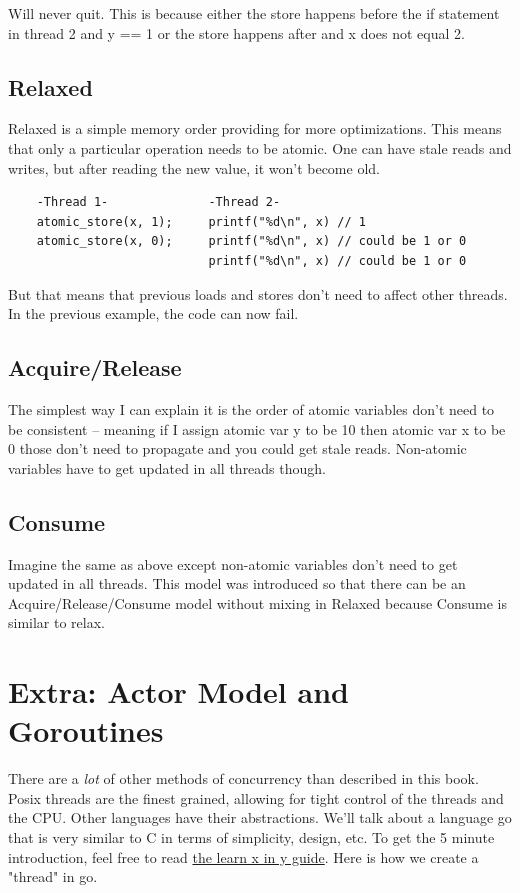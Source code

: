 Will never quit.
This is because either the store happens before the if statement in thread 2 and y == 1 or the store happens after and x does not equal 2.

\subsection{Relaxed}

Relaxed is a simple memory order providing for more optimizations.
This means that only a particular operation needs to be atomic.
One can have stale reads and writes, but after reading the new value, it won't become old.

\begin{verbatim}
    -Thread 1-              -Thread 2-
    atomic_store(x, 1);     printf("%d\n", x) // 1
    atomic_store(x, 0);     printf("%d\n", x) // could be 1 or 0
                            printf("%d\n", x) // could be 1 or 0
\end{verbatim}

But that means that previous loads and stores don't need to affect other threads.
In the previous example, the code can now fail.

\subsection{Acquire/Release}

The simplest way I can explain it is the order of atomic variables don't need to be consistent -- meaning if I assign atomic var y to be 10 then atomic var x to be 0 those don't need to propagate and you could get stale reads.
Non-atomic variables have to get updated in all threads though.

\subsection{Consume}

Imagine the same as above except non-atomic variables don't need to get updated in all threads.
This model was introduced so that there can be an Acquire/Release/Consume model without mixing in Relaxed because Consume is similar to relax.

\section{Extra: Actor Model and Goroutines}

There are a \textit{lot} of other methods of concurrency than described in this book.
Posix threads are the finest grained, allowing for tight control of the threads and the CPU.
Other languages have their abstractions.
We'll talk about a language go that is very similar to C in terms of simplicity, design, etc.
To get the 5 minute introduction, feel free to read \href{https://learnxinyminutes.com/docs/go/}{the learn x in y guide}.
Here is how we create a "thread" in go.


